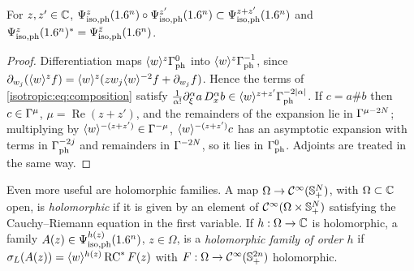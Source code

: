 \begin{proposition}\label{isotropic:prop:complex-order}
For $z,z'\in\mathbb{C}$, $\Psi^{z}_{\mathrm{iso,ph}}(1.6^n)\circ\Psi^{z'}_{\mathrm{iso,ph}}(1.6^n)\subset\Psi^{z+z'}_{\mathrm{iso,ph}}(1.6^n)$
and $\Psi^{z}_{\mathrm{iso,ph}}(1.6^n)^*=\Psi^{\bar z}_{\mathrm{iso,ph}}(1.6^n)$.
\end{proposition}
\begin{proof}
Differentiation maps $\langle w\rangle^z\Gamma^{0}_{\mathrm{ph}}$ into $\langle w\rangle^z\Gamma^{-1}_{\mathrm{ph}}$, since
$\partial_{w_j}(\langle w\rangle^zf)=\langle w\rangle^z(zw_j\langle w\rangle^{-2}f+\partial_{w_j}f)$. Hence the terms
of \eqref{isotropic:eq:composition} satisfy
$\frac1{\alpha!}\partial_\xi^\alpha a\,D_x^\alpha b\in\langle w\rangle^{z+z'}\Gamma^{-2|\alpha|}_{\mathrm{ph}}$. If
$c=a\#b$ then $c\in\Gamma^{\mu}$, $\mu=\operatorname{Re}(z+z')$, and the remainders of the
expansion lie in $\Gamma^{\mu-2N}$; multiplying by $\langle w\rangle^{-(z+z')}\in\Gamma^{-\mu}$,
$\langle w\rangle^{-(z+z')}c$ has an asymptotic expansion with terms in $\Gamma^{-2j}_{\mathrm{ph}}$ and
remainders in $\Gamma^{-2N}$, so it lies in $\Gamma^{0}_{\mathrm{ph}}$. Adjoints are treated in the
same way.
\end{proof}

Even more useful are holomorphic families. A map $\Omega\to\mathcal{C}^\infty(\mathbb{S}^{N}_{+})$, with
$\Omega\subset\mathbb{C}$ open, is \emph{holomorphic} if it is given by an element of
$\mathcal{C}^\infty(\Omega\times\mathbb{S}^{N}_{+})$ satisfying the Cauchy--Riemann equation in the first
variable. If $h:\Omega\to\mathbb{C}$ is holomorphic, a family $A(z)\in\Psi^{h(z)}_{\mathrm{iso,ph}}(1.6^n)$,
$z\in\Omega$, is a \emph{holomorphic family of order $h$} if
$\sigma_L(A(z))=\langle w\rangle^{h(z)}\operatorname{RC}^*F(z)$ with $F:\Omega\to\mathcal{C}^\infty(\mathbb{S}^{2n}_{+})$
holomorphic.

